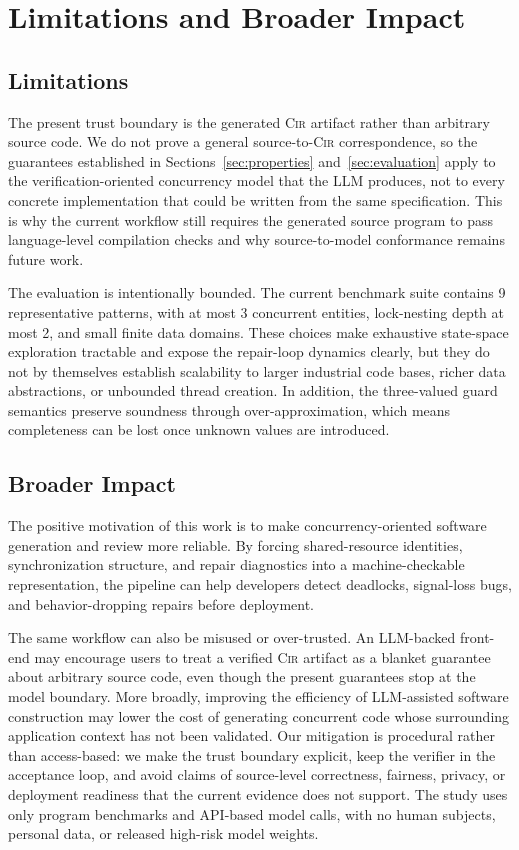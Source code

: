 \section{Limitations and Broader Impact}
\label{sec:limitations}

\subsection{Limitations}
\label{subsec:limitations}

The present trust boundary is the generated \textsc{Cir} artifact rather than arbitrary source code. We do not prove a general source-to-\textsc{Cir} correspondence, so the guarantees established in Sections~\ref{sec:properties} and~\ref{sec:evaluation} apply to the verification-oriented concurrency model that the LLM produces, not to every concrete implementation that could be written from the same specification. This is why the current workflow still requires the generated source program to pass language-level compilation checks and why source-to-model conformance remains future work.

The evaluation is intentionally bounded. The current benchmark suite contains 9 representative patterns, with at most 3 concurrent entities, lock-nesting depth at most 2, and small finite data domains. These choices make exhaustive state-space exploration tractable and expose the repair-loop dynamics clearly, but they do not by themselves establish scalability to larger industrial code bases, richer data abstractions, or unbounded thread creation. In addition, the three-valued guard semantics preserve soundness through over-approximation, which means completeness can be lost once unknown values are introduced.

\subsection{Broader Impact}
\label{subsec:broader-impact}

The positive motivation of this work is to make concurrency-oriented software generation and review more reliable. By forcing shared-resource identities, synchronization structure, and repair diagnostics into a machine-checkable representation, the pipeline can help developers detect deadlocks, signal-loss bugs, and behavior-dropping repairs before deployment.

The same workflow can also be misused or over-trusted. An LLM-backed front-end may encourage users to treat a verified \textsc{Cir} artifact as a blanket guarantee about arbitrary source code, even though the present guarantees stop at the model boundary. More broadly, improving the efficiency of LLM-assisted software construction may lower the cost of generating concurrent code whose surrounding application context has not been validated. Our mitigation is procedural rather than access-based: we make the trust boundary explicit, keep the verifier in the acceptance loop, and avoid claims of source-level correctness, fairness, privacy, or deployment readiness that the current evidence does not support. The study uses only program benchmarks and API-based model calls, with no human subjects, personal data, or released high-risk model weights.
